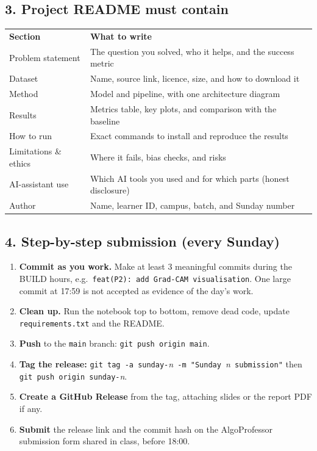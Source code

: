 \documentclass[11pt,a4paper]{article}
\begin{document}
\subsection*{3. Project README must contain}
\small
{}
\begin{tabularx}{\linewidth}{@{}L{4.0cm} Y@{}}
\color{gold}\bfseries Section & \color{gold}\bfseries What to write\\
Problem statement & The question you solved, who it helps, and the success metric\\
Dataset & Name, source link, licence, size, and how to download it\\
Method & Model and pipeline, with one architecture diagram\\
Results & Metrics table, key plots, and comparison with the baseline\\
How to run & Exact commands to install and reproduce the results\\
Limitations \& ethics & Where it fails, bias checks, and risks\\
AI-assistant use & Which AI tools you used and for which parts (honest disclosure)\\
Author & Name, learner ID, campus, batch, and Sunday number\\
\end{tabularx}
\normalsize

\subsection*{4. Step-by-step submission (every Sunday)}
\begin{enumerate}[leftmargin=1.6em,itemsep=2pt]
  \item \textbf{Commit as you work.} Make at least 3 meaningful commits during the BUILD hours, e.g.\ \texttt{feat(P2): add Grad-CAM visualisation}. One large commit at 17:59 is not accepted as evidence of the day's work.
  \item \textbf{Clean up.} Run the notebook top to bottom, remove dead code, update \texttt{requirements.txt} and the README.
  \item \textbf{Push} to the \texttt{main} branch: \texttt{git push origin main}.
  \item \textbf{Tag the release:} \texttt{git tag -a sunday-}\textit{n}\texttt{ -m "Sunday }\textit{n}\texttt{ submission"} then \texttt{git push origin sunday-}\textit{n}.
  \item \textbf{Create a GitHub Release} from the tag, attaching slides or the report PDF if any.
  \item \textbf{Submit} the release link and the commit hash on the AlgoProfessor submission form shared in class, before 18:00.
\end{enumerate}
\end{document}
